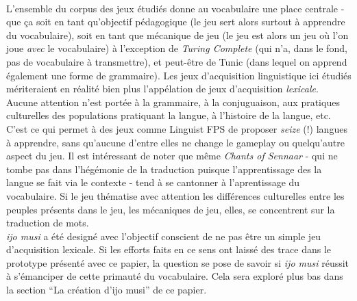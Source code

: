 \documentclass{scrartcl}
\let\emph\relax %
\begin{document}
		\emph{Place centrale du vocabulaire}\\
		L'ensemble du corpus des jeux étudiés donne au vocabulaire une place centrale - que ça soit en tant qu'objectif pédagogique (le jeu sert alors surtout à apprendre du vocabulaire), soit en tant que mécanique de jeu (le jeu est alors un jeu où l'on joue \textit{avec} le vocabulaire) à l'exception de \textit{Turing Complete} (qui n'a, dans le fond, pas de vocabulaire à transmettre), et peut-être de Tunic (dans lequel on apprend également une forme de grammaire). Les jeux d'acquisition linguistique ici étudiés mériteraient en réalité bien plus l'appélation de jeux d'acquisition \textit{lexicale}. Aucune attention n'est portée à la grammaire, à la conjuguaison, aux pratiques culturelles des populations pratiquant la langue, à l'histoire de la langue, etc. C'est ce qui permet à des jeux comme Linguist FPS de proposer \textit{seize} (!) langues à apprendre, sans qu'aucune d'entre elles ne change le gameplay ou quelqu'autre aspect du jeu. Il est intéressant de noter que même \textit{Chants of Sennaar} - qui ne tombe pas dans l'hégémonie de la traduction puisque l'apprentissage des la langue se fait via le contexte - tend à se cantonner à l'aprentissage du vocabulaire. Si le jeu thématise avec attention les différences culturelles entre les peuples présents dans le jeu, les mécaniques de jeu, elles, se concentrent sur la traduction de mots.\\
		
		\textit{ijo musi} a été designé avec l'objectif conscient de ne pas être un simple jeu d'acquisition lexicale. Si les efforts faits en ce sens ont laissé des trace dans le prototype présenté avec ce papier, la question se pose de savoir si \textit{ijo musi} réussit à s'émanciper de cette primauté du vocabulaire. Cela sera exploré plus bas dans la section “La création d'ijo musi” de ce papier.\\
		
\end{document}
